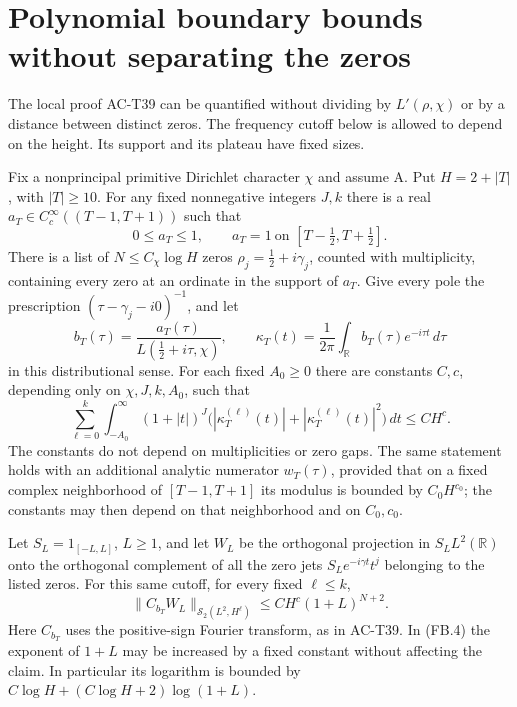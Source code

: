 \section{Polynomial boundary bounds without separating the zeros}
\label{sec:trace-frequency-boundary}

The local proof AC-T39 can be quantified without dividing by
$L'(\rho,\chi)$ or by a distance between distinct zeros.
The frequency cutoff below is allowed to depend on the height.
Its support and its plateau have fixed sizes.

\begin{theorem}
\label{AC-T40}
Fix a nonprincipal primitive Dirichlet character $\chi$ and
assume A.  Put $H=2+|T|$, with $|T|\geq10$.
For any fixed nonnegative integers $J,k$ there is a real
$a_T\in C_c^\infty((T-1,T+1))$ such that
\[
 0\leq a_T\leq1,\qquad a_T=1\ \text{on }[T-\tfrac12,T+\tfrac12].
                                                               \tag{FB.1}
\]
There is a list of $N\leq C_\chi\log H$ zeros
$\rho_j=\tfrac12+i\gamma_j$, counted with multiplicity,
containing every zero at an ordinate in the support of $a_T$.
Give every pole the prescription
$(\tau-\gamma_j-i0)^{-1}$, and let
\[
 b_T(\tau)=\frac{a_T(\tau)}{L(\tfrac12+i\tau,\chi)},\qquad
 \kappa_T(t)=\frac1{2\pi}\int_{\mathbb R}b_T(\tau)e^{-i\tau t}\,d\tau
                                                               \tag{FB.2}
\]
in this distributional sense.
For each fixed $A_0\geq0$ there are constants $C,c$, depending
only on $\chi,J,k,A_0$, such that
\[
 \sum_{\ell=0}^k\int_{-A_0}^{\infty}(1+|t|)^J
       \bigl(|\kappa_T^{(\ell)}(t)|
                    +|\kappa_T^{(\ell)}(t)|^2\bigr)\,dt
                   \leq C H^c.                              \tag{FB.3}
\]
The constants do not depend on multiplicities or zero gaps.
The same statement holds with an additional analytic numerator
$w_T(\tau)$, provided that on a fixed complex neighborhood of
$[T-1,T+1]$ its modulus is bounded by $C_0H^{c_0}$;
the constants may then depend on that neighborhood and on
$C_0,c_0$.

Let $S_L=1_{[-L,L]}$, $L\geq1$, and let $W_L$ be the
orthogonal projection in $S_LL^2(\mathbb R)$ onto the
orthogonal complement of all the zero jets
$S_Le^{-i\gamma t}t^j$ belonging to the listed zeros.
For this same cutoff, for every fixed $\ell\leq k$,
\[
 \|C_{b_T}W_L\|_{\mathcal S_2(L^2,H^\ell)}
                 \leq C H^c(1+L)^{N+2}.                     \tag{FB.4}
\]
Here $C_{b_T}$ uses the positive-sign Fourier transform,
as in AC-T39.  In (FB.4) the exponent of $1+L$ may be
increased by a fixed constant without affecting the claim.
In particular its logarithm is bounded by
$C\log H+(C\log H+2)\log(1+L)$.
\end{theorem}
